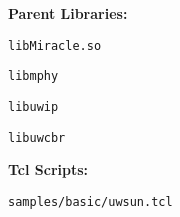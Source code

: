 \begin{description}
   \item {\bf Parent Libraries:}
   \begin{description}
      \item {\tt libMiracle.so}
      \item {\tt libmphy}
      \item {\tt libuwip}
      \item {\tt libuwcbr}
   \end{description}
   \item {\bf Tcl Scripts:} 
   \begin{description}
      \item {\tt samples/basic/uwsun.tcl}
   \end{description} 
\end{description}

\vspace{1 cm}

